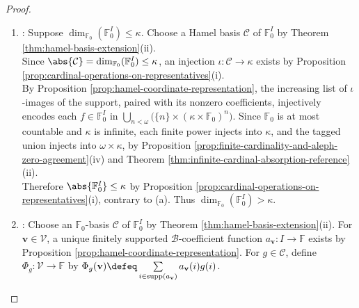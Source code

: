\begin{theorem}
\begin{proof}
\begin{enumerate}[label=(\roman*)]
\begin{enumerate}[label=(\alph*)]
Thus $\mathbb{F}_0$ is a subfield. The set $D$ is at most countable by Proposition \ref{prop:integers-countable}, Corollary \ref{cor:countable-cartesian-products}(ii), and Proposition \ref{prop:subsets-and-images-at-most-countable}(i), so $\mathbb{F}_0$ is at most countable by Proposition \ref{prop:subsets-and-images-at-most-countable}(ii). The map $E\mapsto\mathbf{1}_E$ injects $\mathcal{P}(I)$ into $\mathbb{F}_0^I$.\\
The map $i\mapsto\{i\}$ injects $I$ into $\mathcal{P}(I)$, while $I\not\sim_{\#}\mathcal{P}(I)$ by Theorem \ref{thm:cantor-power-set-theorem}.\\
Hence $\kappa<\abs{\mathcal{P}(I)}\leq\abs{\mathbb{F}_0^I}$ by Proposition \ref{prop:cardinal-operations-on-representatives}(i),(ii).
\item {}: Suppose $\dim_{\mathbb{F}_0}(\mathbb{F}_0^I)\leq\kappa$. Choose a Hamel basis $\mathcal{C}$ of $\mathbb{F}_0^I$ by Theorem \ref{thm:hamel-basis-extension}(ii).\\
Since $\abs{\mathcal{C}}=\dim_{\mathbb{F}_0}(\mathbb{F}_0^I)\leq\kappa$, an injection $\iota:\mathcal{C}\to\kappa$ exists by Proposition \ref{prop:cardinal-operations-on-representatives}(i).\\
By Proposition \ref{prop:hamel-coordinate-representation}, the increasing list of $\iota$-images of the support, paired with its nonzero coefficients, injectively encodes each $f\in\mathbb{F}_0^I$ in $\bigcup\limits_{n<\omega}\bigl(\{n\}\times(\kappa\times\mathbb{F}_0)^n\bigr)$. Since $\mathbb{F}_0$ is at most countable and $\kappa$ is infinite, each finite power injects into $\kappa$, and the tagged union injects into $\omega\times\kappa$, by Proposition \ref{prop:finite-cardinality-and-aleph-zero-agreement}(iv) and Theorem \ref{thm:infinite-cardinal-absorption-reference}(ii).\\
Therefore $\abs{\mathbb{F}_0^I}\leq\kappa$ by Proposition \ref{prop:cardinal-operations-on-representatives}(i), contrary to (a). Thus $\dim_{\mathbb{F}_0}(\mathbb{F}_0^I)>\kappa$.
\item {}: Choose an $\mathbb{F}_0$-basis $\mathcal{C}$ of $\mathbb{F}_0^I$ by Theorem \ref{thm:hamel-basis-extension}(ii). For $\mathbf{v}\in\mathcal{V}$, a unique finitely supported $\mathcal{B}$-coefficient function $a_{\mathbf{v}}:I\to\mathbb{F}$ exists by Proposition \ref{prop:hamel-coordinate-representation}. For $g\in\mathcal{C}$, define $\Phi_g:\mathcal{V}\to\mathbb{F}$ by $\Phi_g(\mathbf{v})\defeq\sum\limits_{i\in\operatorname{supp}(a_{\mathbf{v}})}a_{\mathbf{v}}(i)g(i)$.\\

\end{enumerate}
\end{enumerate}
\end{proof}
\end{theorem}
